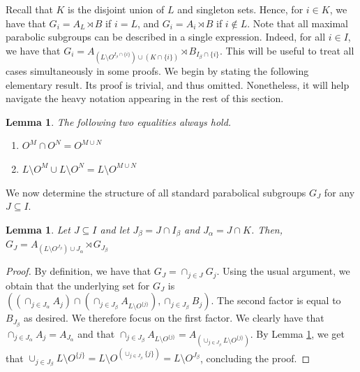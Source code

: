 \documentclass[11pt,letterpaper]{amsart}
\newtheorem{lemma}[prop]{Lemma}
\begin{document}
Recall that $K$ is the disjoint union of $L$ and singleton sets. Hence, for $i \in K$, we have that $G_i = A_L \rtimes B$ if $i = L$, and $G_i = A_i \rtimes B$ if $i \notin L$. Note that all maximal parabolic subgroups can be described in a single expression. Indeed, for all $i \in I$, we have that $G_i = A_{(L\setminus O^{I_\beta\cap \{i\}})\cup (K\cap \{i\})} \rtimes B_{I_\beta \cap \{i\}}$. This will be useful to treat all cases simultaneously in some proofs. We begin by stating the following elementary result. Its proof is trivial, and thus omitted. Nonetheless, it will help navigate the heavy notation appearing in the rest of this section.

\begin{lemma}\label{lem:setIntersections}
The following two equalities always hold.
    \begin{enumerate}
        \item $O^M \cap O^N = O^{M \cup N}$
        \item $L \setminus O^M \cup L \setminus O^N = L \setminus O^{M \cup N}$
    \end{enumerate}
\end{lemma}

We now determine the structure of all standard parabolical subgroups $G_J$ for any $J \subseteq I$.

\begin{lemma}\label{lem:TwistG_J}
    Let $J \subseteq I$ and let $J_\beta = J \cap I_\beta$ and $J_\alpha = J \cap K$. Then, $G_J = A_{(L\setminus O^{J_\beta}) \cup J_\alpha}\rtimes G_{J_\beta}$ %
\end{lemma}
\begin{proof}
    By definition, we have that $G_J = \cap_{j \in J} G_j$.
    Using the usual argument, we obtain that the underlying set for $G_J$ is $( (\cap_{j \in J_\alpha} A_j) \cap ( \cap_{j \in J_\beta} A_{L \setminus O^{\{j\}}}) , \cap_{j \in J_\beta} B_j)$. The second factor is equal to $B_{J_\beta}$ as desired. We therefore focus on the first factor. We clearly have that $\cap_{j \in J_\alpha} A_j = A_{J_\alpha}$ and that $\cap_{j \in J_\beta} A_{L \setminus O^{\{j\}}} = A_{(\cup_{j \in J_\beta} L \setminus O^{\{j\}})}$. By Lemma \ref{lem:setIntersections}, we get that $\cup_{j \in J_\beta} L \setminus O^{\{j\}} = L \setminus O^{(\cup_{j\in J_\beta} \{j\})} = L \setminus O^{J_\beta}$, concluding the proof.
\end{proof}
\end{document}
